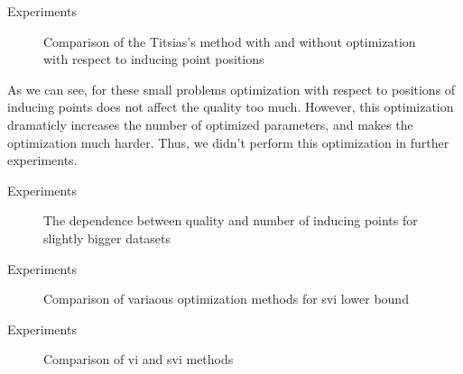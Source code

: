 \begin{frame}{Experiments}
			\begin{figure}[!h]
				\centering
				\subfloat{
					\scalebox{0.4}{
						
					}
				}
				\subfloat{
					\scalebox{0.4}{
						
					}
				}
				\caption{Comparison of the Titsias's method with and without optimization with respect to inducing point positions}
			\end{figure}
			As we can see, for these small problems optimization with respect to positions of inducing points does not affect the quality too much. However, this optimization dramaticly increases the number of optimized parameters, and makes the optimization much harder. Thus, we didn't perform this optimization in further experiments.
		\end{frame}

		\begin{frame}{Experiments}
			\begin{figure}[!h]
				\centering
				\subfloat{
					\scalebox{0.4}{
						
					}
				}
				\subfloat{
					\scalebox{0.4}{
						
					}
				}
				\caption{The dependence between quality and number of inducing points for slightly bigger datasets}
			\end{figure}
		\end{frame}

		\begin{frame}{Experiments}
			\begin{figure}[!h]
				\centering
				\subfloat{
					\scalebox{0.4}{
						
					}
				}
				\subfloat{
					\scalebox{0.4}{
						
					}
				}
				\caption{Comparison of variaous optimization methods for svi lower bound}
			\end{figure}
		\end{frame}

		\begin{frame}{Experiments}
			\begin{figure}[!h]
				\centering
				\subfloat{
					\scalebox{0.4}{
						
					}
				}
				\subfloat{
					\scalebox{0.4}{
						
					}
				}
				\caption{Comparison of vi and svi methods}
			\end{figure}
		\end{frame}